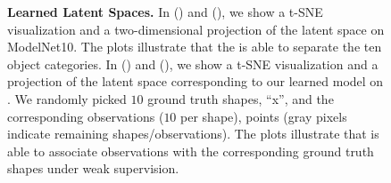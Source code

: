 \begin{figure}[tp]
\begin{subfigure}[t]{0.49\linewidth}
        \label{fig:results-latent-space-b2}
    \end{subfigure}
    \vspace*{-\figskipcaption px}
    \caption{{\bf Learned Latent Spaces.} In () and (), we show a t-SNE \citep{Maaten2008JMLR} visualization and a two-dimensional projection of the \DVAE latent space on ModelNet10. The plots illustrate that the \DVAE is able to separate the ten object categories. In () and (), we show a t-SNE visualization and a projection of the latent space corresponding to our learned \AML model on \clean. We randomly picked $10$ ground truth shapes,  ``x'', and the corresponding observations ($10$ per shape), points (gray pixels indicate remaining shapes/observations). The plots illustrate that \AML is able to associate observations with the corresponding ground truth shapes under weak supervision.}
    \label{fig:results-latent-space}
    \vspace*{-\figskipbelow px}
\end{figure}